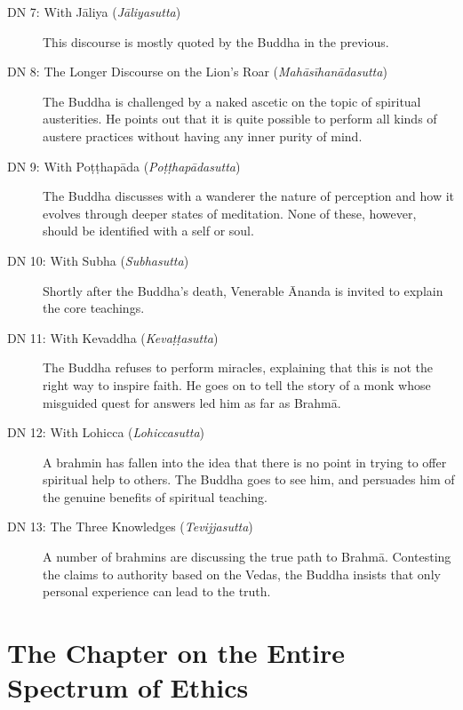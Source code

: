 \documentclass[12pt,openany]{book}%
\let\oldcontentsline\contentsline
\newcommand{\nopagecontentsline}[3]{\oldcontentsline{#1}{#2}{}}
\let\oldmainmatter\mainmatter
\renewcommand{\mainmatter}{%
\chapterfont{\setstretch{.85}\normalfont\centering}%
\sectionfont{\setstretch{.85}\Semiboldsubheadfont}%
\oldmainmatter}
\begin{document}
\begin{description}
\item[DN 7: With \textsanskrit{Jāliya} (\textit{\textsanskrit{Jāliyasutta}})] This discourse is mostly quoted by the Buddha in the previous.%
\item[DN 8: The Longer Discourse on the Lion’s Roar (\textit{\textsanskrit{Mahāsīhanādasutta}})] The Buddha is challenged by a naked ascetic on the topic of spiritual austerities. He points out that it is quite possible to perform all kinds of austere practices without having any inner purity of mind.%
\item[DN 9: With \textsanskrit{Poṭṭhapāda} (\textit{\textsanskrit{Poṭṭhapādasutta}})] The Buddha discusses with a wanderer the nature of perception and how it evolves through deeper states of meditation. None of these, however, should be identified with a self or soul.%
\item[DN 10: With Subha (\textit{\textsanskrit{Subhasutta}})] Shortly after the Buddha’s death, Venerable Ānanda is invited to explain the core teachings.%
\item[DN 11: With Kevaddha (\textit{\textsanskrit{Kevaṭṭasutta}})] The Buddha refuses to perform miracles, explaining that this is not the right way to inspire faith. He goes on to tell the story of a monk whose misguided quest for answers led him as far as \textsanskrit{Brahmā}.%
\item[DN 12: With Lohicca (\textit{\textsanskrit{Lohiccasutta}})] A brahmin has fallen into the idea that there is no point in trying to offer spiritual help to others. The Buddha goes to see him, and persuades him of the genuine benefits of spiritual teaching.%
\item[DN 13: The Three Knowledges (\textit{\textsanskrit{Tevijjasutta}})] A number of brahmins are discussing the true path to \textsanskrit{Brahmā}. Contesting the claims to authority based on the Vedas, the Buddha insists that only personal experience can lead to the truth.%
\end{description}

%
\mainmatter%
\pagestyle{fancy}%
\part*{The Chapter on the Entire Spectrum of Ethics }
\markboth{}{}
\addtocontents{toc}{\let\protect\contentsline\protect\oldcontentsline}

%
\end{document}
